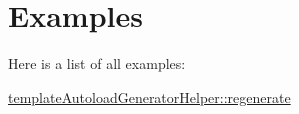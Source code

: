 \section{\-Examples}
\-Here is a list of all examples\-:\begin{DoxyCompactItemize}
\item 
\hyperlink{template_autoload_generator_helper_1_1regenerate-example}{template\-Autoload\-Generator\-Helper\-::regenerate}
\end{DoxyCompactItemize}
